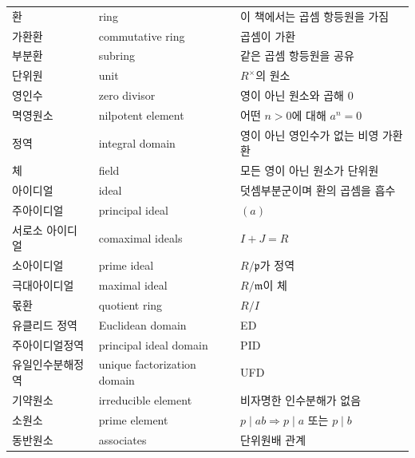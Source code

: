 \begin{longtable}{>{\raggedright\arraybackslash}p{}>{\raggedright\arraybackslash}p{}p{}}
\addlinespace
환 & ring & 이 책에서는 곱셈 항등원을 가짐 \\
가환환 & commutative ring & 곱셈이 가환 \\
부분환 & subring & 같은 곱셈 항등원을 공유 \\
단위원 & unit & $R^\times$의 원소 \\
영인수 & zero divisor & 영이 아닌 원소와 곱해 $0$ \\
멱영원소 & nilpotent element & 어떤 $n>0$에 대해 $a^n=0$ \\
정역 & integral domain & 영이 아닌 영인수가 없는 비영 가환환 \\
체 & field & 모든 영이 아닌 원소가 단위원 \\
아이디얼 & ideal & 덧셈부분군이며 환의 곱셈을 흡수 \\
주아이디얼 & principal ideal & $(a)$ \\
서로소 아이디얼 & comaximal ideals & $I+J=R$ \\
소아이디얼 & prime ideal & $R/\mathfrak p$가 정역 \\
극대아이디얼 & maximal ideal & $R/\mathfrak m$이 체 \\
몫환 & quotient ring & $R/I$ \\
유클리드 정역 & Euclidean domain & ED \\
주아이디얼정역 & principal ideal domain & PID \\
유일인수분해정역 & unique factorization domain & UFD \\
기약원소 & irreducible element & 비자명한 인수분해가 없음 \\
소원소 & prime element & $p\mid ab\Rightarrow p\mid a$ 또는 $p\mid b$ \\
동반원소 & associates & 단위원배 관계 \\


\end{longtable}
